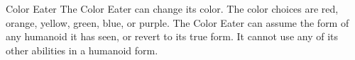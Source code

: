 \begin{DndMonster}[float*=b,width=0.5\textwidth + 8pt]{Color Eater}
    The Color Eater can change its color. The color choices are red, orange, yellow, green, blue, or purple.
    The Color Eater can assume the form of any humanoid it has seen, or revert to its true form. It cannot use any of its other abilities in a humanoid form.
\end{DndMonster}
